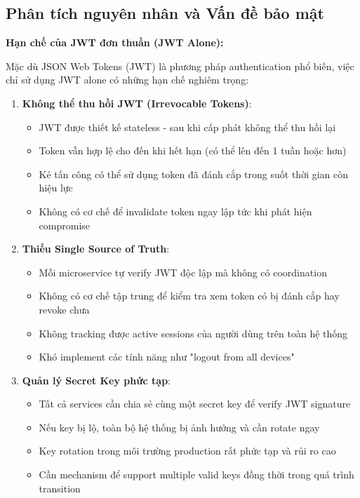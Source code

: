 \subsection{Phân tích nguyên nhân và Vấn đề bảo mật}

\noindent\textbf{Hạn chế của JWT đơn thuần (JWT Alone):}

Mặc dù JSON Web Tokens (JWT) là phương pháp authentication phổ biến, việc chỉ sử dụng JWT alone có những hạn chế nghiêm trọng:

\begin{enumerate}
    \item \textbf{Không thể thu hồi JWT (Irrevocable Tokens)}:
    \begin{itemize}
        \item JWT được thiết kế stateless - sau khi cấp phát không thể thu hồi lại
        \item Token vẫn hợp lệ cho đến khi hết hạn (có thể lên đến 1 tuần hoặc hơn)
        \item Kẻ tấn công có thể sử dụng token đã đánh cắp trong suốt thời gian còn hiệu lực
        \item Không có cơ chế để invalidate token ngay lập tức khi phát hiện compromise
    \end{itemize}
    
    \item \textbf{Thiếu Single Source of Truth}:
    \begin{itemize}
        \item Mỗi microservice tự verify JWT độc lập mà không có coordination
        \item Không có cơ chế tập trung để kiểm tra xem token có bị đánh cắp hay revoke chưa
        \item Không tracking được active sessions của người dùng trên toàn hệ thống
        \item Khó implement các tính năng như "logout from all devices"
    \end{itemize}
    
    \item \textbf{Quản lý Secret Key phức tạp}:
    \begin{itemize}
        \item Tất cả services cần chia sẻ cùng một secret key để verify JWT signature
        \item Nếu key bị lộ, toàn bộ hệ thống bị ảnh hưởng và cần rotate ngay
        \item Key rotation trong môi trường production rất phức tạp và rủi ro cao
        \item Cần mechanism để support multiple valid keys đồng thời trong quá trình transition
    \end{itemize}
\end{enumerate}

